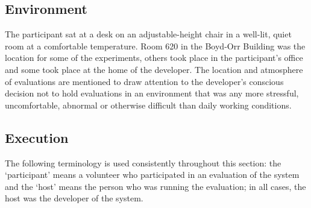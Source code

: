 \subsection{Environment}
The participant sat at a desk on an adjustable-height chair in a well-lit, quiet room at a comfortable temperature.	 Room 620 in the Boyd-Orr Building was the location for some of the experiments, others took place in the participant's office and some took place at the home of the developer.  The location and atmosphere of evaluations are mentioned to draw attention to the developer's conscious decision not to hold evaluations in an environment that was any more stressful, uncomfortable, abnormal or otherwise difficult than daily working conditions.

\subsection{Execution}
The following terminology is used consistently throughout this section: the `participant' means a volunteer who participated in an evaluation of the system and the `host' means the person who was running the evaluation; in all cases, the host was the developer of the system.

